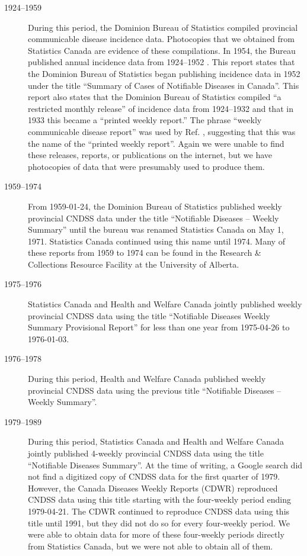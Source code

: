 \documentclass[12pt]{article}
\begin{document}
\begin{description}
\item[1924--1959] During this period, the Dominion Bureau of Statistics compiled provincial communicable disease incidence data. Photocopies that we obtained from Statistics Canada are evidence of these compilations. In 1954, the Bureau published annual incidence data from 1924--1952 \cite{summaryNotifiable1954}. This report states that the Dominion Bureau of Statistics began publishing incidence data in 1952 under the title ``Summary of Cases of Notifiable Diseases in Canada''. This report also states that the Dominion Bureau of Statistics compiled ``a restricted monthly release'' of incidence data from 1924--1932 and that in 1933 this became a ``printed weekly report.'' The  phrase ``weekly communicable disease report'' was used by Ref. \cite{summaryNotifiable1954}, suggesting that this was the name of the ``printed weekly report''. Again we were unable to find these releases, reports, or publications on the internet, but we have photocopies of data that were presumably used to produce them.
\item[1959--1974] From 1959-01-24, the Dominion Bureau of Statistics published weekly provincial CNDSS data under the title ``Notifiable Diseases -- Weekly Summary'' until the bureau was renamed Statistics Canada on May 1, 1971. Statistics Canada continued using this name until 1974. Many of these reports from 1959 to 1974 can be found in the Research \& Collections Resource Facility at the University of Alberta.
\item[1975--1976] Statistics Canada and Health and Welfare Canada jointly published weekly provincial CNDSS data using the title ``Notifiable Diseases Weekly Summary Provisional Report'' for less than one year from 1975-04-26 to 1976-01-03.
\item[1976--1978] During this period, Health and Welfare Canada published weekly provincial CNDSS data using the previous title ``Notifiable Diseases -- Weekly Summary''.
\item[1979--1989] During this period, Statistics Canada and Health and Welfare Canada jointly published 4-weekly provincial CNDSS data using the title ``Notifiable Diseases Summary''.  At the time of writing, a Google search did not find a digitized copy of CNDSS data for the first quarter of 1979. However, the Canada Diseases Weekly Reports (CDWR) reproduced CNDSS data using this title starting with the four-weekly period ending 1979-04-21. The CDWR continued to reproduce CNDSS data using this title until 1991, but they did not do so for every four-weekly period.  We were able to obtain data for more of these four-weekly periods directly from Statistics Canada, but we were not able to obtain all of them.

\end{description}
\end{document}
